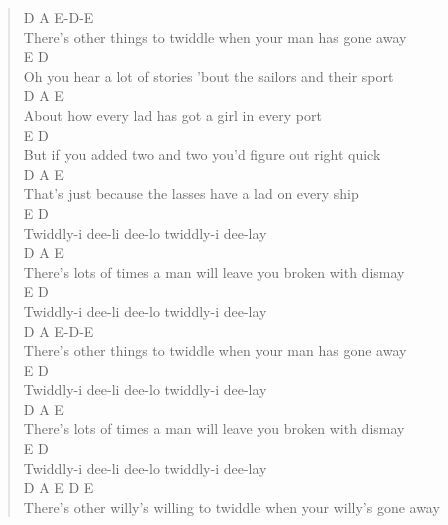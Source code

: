 \documentclass[11pt]{article}
\begin{document}
\begin{verse}
\hspace*{8em}D                                 A              E-D-E\\
There's other things to twiddle when your man has gone away\\
\vspace*{1em}
\vspace*{1em}
\hspace*{8em}E                               D\\
Oh you hear a lot of stories 'bout the sailors and their sport\\
\hspace*{1em}D                            A             E\\
About how every lad has got a girl in every port\\
\hspace*{7em}E                            D\\
But if you added two and two you'd figure out right quick\\
\hspace*{7em}D                              A            E\\
That's just because the lasses have a lad on every ship\\
\vspace*{1em}
\vspace*{1em}
E                        D\\
Twiddly-i dee-li dee-lo twiddly-i dee-lay\\
\hspace*{9em}D                                 A           E\\
There's lots of times a man will leave you broken with dismay\\
E                         D\\
Twiddly-i dee-li dee-lo twiddly-i dee-lay\\
\hspace*{8em}D                                 A              E-D-E\\
There's other things to twiddle when your man has gone away\\
\vspace*{1em}
\vspace*{1em}
\vspace*{1em}
E                        D\\
Twiddly-i dee-li dee-lo twiddly-i dee-lay\\
\hspace*{9em}D                                 A           E\\
There's lots of times a man will leave you broken with dismay\\
E                         D\\
Twiddly-i dee-li dee-lo twiddly-i dee-lay\\
\hspace*{14em}D                  A                 E       D    E\\
There's other willy's willing to twiddle when your willy's gone away\\
\end{verse}
\clearpage
\end{document}
